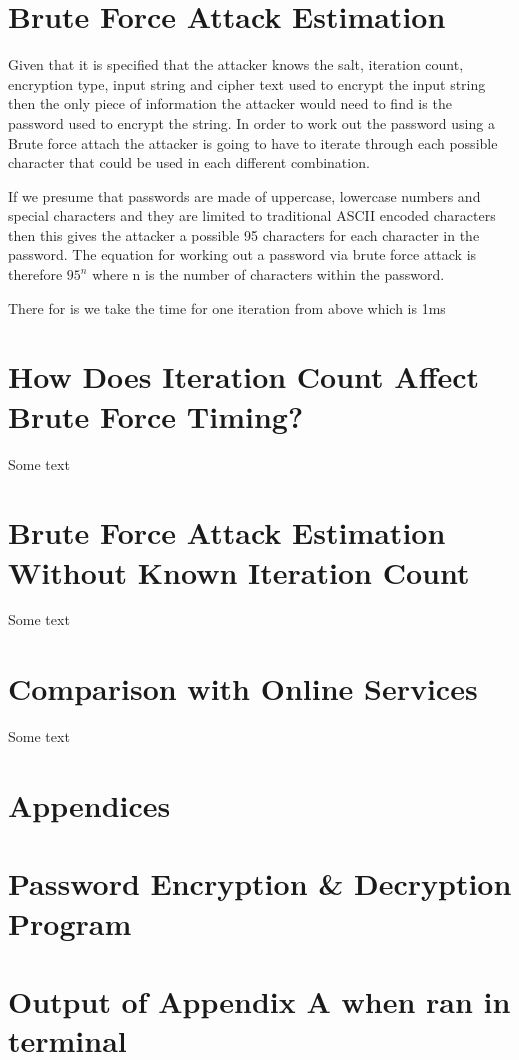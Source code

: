 \documentclass[a4paper, twoside, 11pt]{article}
\begin{document}
\section{Brute Force Attack Estimation}
Given that it is specified that the attacker knows the salt, iteration count, encryption type, 
input string and cipher text used to encrypt the input string then the only piece of information 
the attacker would need to find is the password used to encrypt the string. 
In order to work out the password using a Brute force attach the attacker is going to have to 
iterate through each possible character that could be used in each different combination.

If we presume that passwords are made of uppercase, lowercase numbers and special characters and they are
limited to traditional ASCII encoded characters then this gives the attacker a possible 95 characters for each character in the password.
The equation for working out a password via brute force attack is therefore $95^n$ where n is the number of characters within the password.

There for is we take the time for one iteration from above which is 1ms 

\section{How Does Iteration Count Affect Brute Force Timing?}
Some text

\section{Brute Force Attack Estimation Without Known Iteration Count}
Some text

\section{Comparison with Online Services}
Some text

\newpage
\section*{Appendices}
\appendix
\section{Password Encryption \& Decryption Program}

\newpage
\section{Output of Appendix A when ran in terminal}

\end{document}
